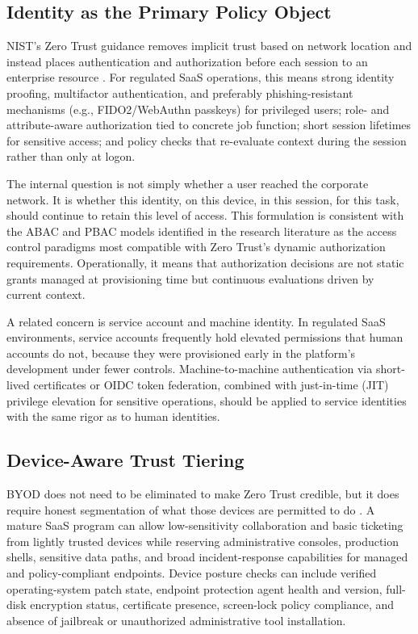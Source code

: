 \documentclass[unnumsec,webpdf,contemporary,large]{oup-authoring-template}
\theoremstyle{thmstyleone}
\theoremstyle{thmstyletwo}
\theoremstyle{thmstylethree}
\begin{document}
\subsection{Identity as the Primary Policy Object}

NIST's Zero Trust guidance removes implicit trust based on network location and instead
places authentication and authorization before each session to an enterprise resource
\cite{rose2020}. For regulated SaaS operations, this means strong identity proofing,
multifactor authentication, and preferably phishing-resistant mechanisms (e.g.,
FIDO2/WebAuthn passkeys) for privileged users; role- and attribute-aware authorization
tied to concrete job function; short session lifetimes for sensitive access; and policy
checks that re-evaluate context during the session rather than only at logon.

The internal question is not simply whether a user reached the corporate network. It is
whether this identity, on this device, in this session, for this task, should continue to
retain this level of access. This formulation is consistent with the ABAC and PBAC models
identified in the research literature \cite{hu2014} as the access control paradigms most
compatible with Zero Trust's dynamic authorization requirements. Operationally, it means
that authorization decisions are not static grants managed at provisioning time but
continuous evaluations driven by current context.

A related concern is service account and machine identity. In regulated SaaS environments,
service accounts frequently hold elevated permissions that human accounts do not, because
they were provisioned early in the platform's development under fewer controls.
Machine-to-machine authentication via short-lived certificates or OIDC token federation,
combined with just-in-time (JIT) privilege elevation for sensitive operations, should be
applied to service identities with the same rigor as to human identities.

\subsection{Device-Aware Trust Tiering}

BYOD does not need to be eliminated to make Zero Trust credible, but it does require
honest segmentation of what those devices are permitted to do \cite{balasubramanian2021}.
A mature SaaS program can allow low-sensitivity collaboration and basic ticketing from
lightly trusted devices while reserving administrative consoles, production shells,
sensitive data paths, and broad incident-response capabilities for managed and
policy-compliant endpoints. Device posture checks can include verified operating-system
patch state, endpoint protection agent health and version, full-disk encryption status,
certificate presence, screen-lock policy compliance, and absence of jailbreak or
unauthorized administrative tool installation.
\end{document}
